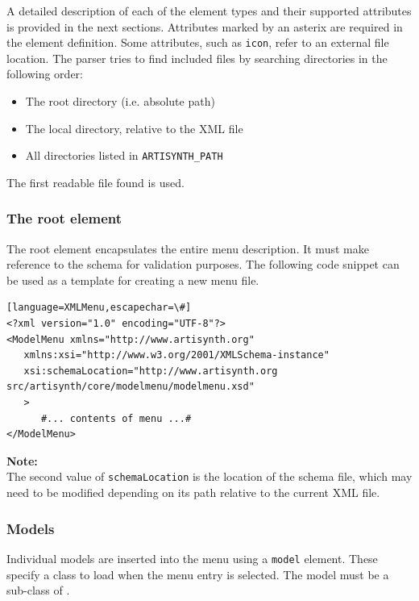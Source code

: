\documentclass{article}
\begin{document}
A detailed description of each of the element types and their supported 
attributes is provided in the next sections.  Attributes marked by an asterix
are required in the element definition.  Some attributes, such as {\tt icon}, 
refer to an external file location.  The parser tries to find included files 
by searching directories in the  following order:
\begin{itemize}
  \setlength{\itemsep}{0pt}
  \item The root directory (i.e. absolute path)
  \item The local directory, relative to the XML file
  \item All directories listed in {\tt ARTISYNTH\_PATH}
\end{itemize}
The first readable file found is used.

\subsubsection{The root element}

The root element encapsulates the entire menu description.  It must make 
reference to the schema for validation purposes.  The following code snippet
can be used as a template for creating a new menu file.
\begin{lstlisting}[][language=XMLMenu,escapechar=\#]
<?xml version="1.0" encoding="UTF-8"?>
<ModelMenu xmlns="http://www.artisynth.org"
   xmlns:xsi="http://www.w3.org/2001/XMLSchema-instance"
   xsi:schemaLocation="http://www.artisynth.org src/artisynth/core/modelmenu/modelmenu.xsd"
   >
      #... contents of menu ...#
</ModelMenu>
\end{lstlisting}

\begin{sideblock}
{\bf Note:}\\
The second value of {\tt schemaLocation} is the location of the schema file, 
which may need to be modified depending on its path relative to the current 
XML file.
\end{sideblock}

\subsubsection{Models}

Individual models are inserted into the menu using a {\tt model} element.
These specify a class to load when the menu entry is selected.  The model
must be a sub-class of .  
\end{document}
